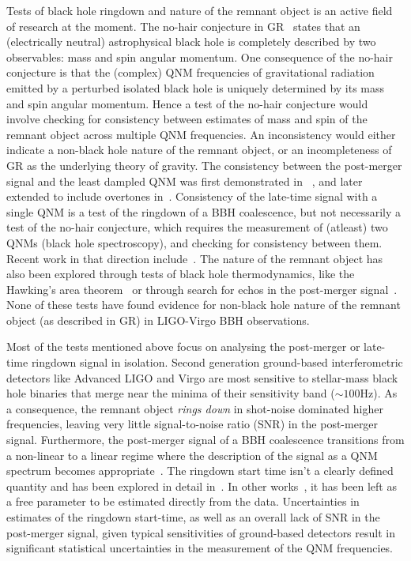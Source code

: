 \documentclass[twocolumn,prd,superscriptaddress,amsfonts,amssymb,amsmath,preprintnumbers]{revtex4-1}
\begin{document}
\par
Tests of black hole ringdown and nature of the remnant object is an active field of research at the moment. The no-hair conjecture in GR~\citep{} states that an (electrically neutral) astrophysical black hole is completely described by two observables: mass and spin angular momentum. One consequence of the no-hair conjecture is that the (complex) QNM frequencies of gravitational radiation emitted by a perturbed isolated black hole is uniquely determined by its mass and spin angular momentum. Hence a test of the no-hair conjecture would involve checking for consistency between estimates of mass and spin of the remnant object across multiple QNM frequencies. An inconsistency would either indicate a non-black hole nature of the remnant object, or an incompleteness of GR as the underlying theory of gravity. The consistency between the post-merger signal and the least dampled QNM was first demonstrated in ~\citep{LSC_2016grtests}, and later extended to include overtones in~\citep{Giesler:2019uxc,Isi:2019aib,Bhagwat:2019dtm,Forteza:2020hbw}. Consistency of the late-time signal with a single QNM is a test of the ringdown of a BBH coalescence, but not necessarily a test of the no-hair conjecture, which requires the measurement of (atleast) two QNMs (black hole spectroscopy), and checking for consistency between them. Recent work in that direction include~\citep{Carullo:2018gah,Carullo:2019flw,Bhagwat:2019bwv}. The nature of the remnant object has also been explored through tests of black hole thermodynamics, like the Hawking's area theorem~\citep{Cabero:2017avf} or through search for echos in the post-merger signal~\citep{Nielsen:2018lkf,Tsang:2019zra,Lo:2018sep,Abedi:2018npz,Abedi:2020sgg,Testa:2018bzd}. None of these tests have found evidence for non-black hole nature of the remnant object (as described in GR) in LIGO-Virgo BBH observations.
\par
Most of the tests mentioned above focus on analysing the post-merger or late-time ringdown signal in isolation. Second generation ground-based interferometric detectors like Advanced LIGO and Virgo are most sensitive to stellar-mass black hole binaries that merge near the minima of their sensitivity band ($\sim 100$Hz). As a consequence, the remnant object \textit{rings down} in shot-noise dominated higher frequencies, leaving very little signal-to-noise ratio (SNR) in the post-merger signal. Furthermore, the post-merger signal of a BBH coalescence transitions from a non-linear to a linear regime where the description of the signal as a QNM spectrum becomes appropriate~\citep{}. The ringdown start time isn't a clearly defined quantity and has been explored in detail in~\citep{Bhagwat:2017tkm}. In other works~\citep{Carullo:2018gah,Carullo:2019flw}, it has been left as a free parameter to be estimated directly from the data. Uncertainties in estimates of the ringdown start-time, as well as an overall lack of SNR in the post-merger signal, given typical sensitivities of ground-based detectors result in significant statistical uncertainties in the measurement of the QNM frequencies.
\end{document}
